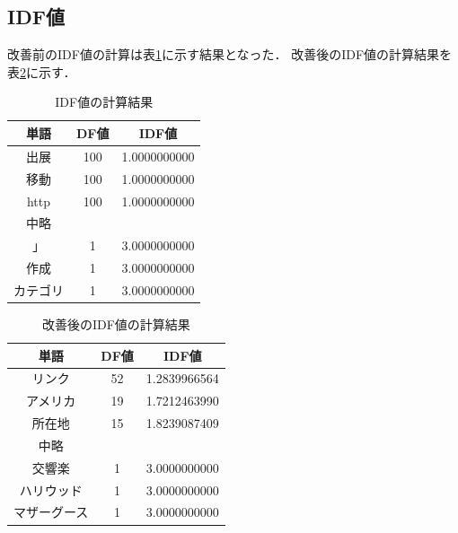 \documentclass[a4paper,11pt]{ltjsarticle}
\begin{document}
\subsection{IDF値}
改善前のIDF値の計算は表\ref{tab:IDF-result}に示す結果となった．
改善後のIDF値の計算結果を表\ref{tab:IDF-result2}に示す．
\begin{table}[htbp]
    \centering
    \caption{IDF値の計算結果}
    \label{tab:IDF-result}
    \begin{tabular}{|c|c|c|}
        \hline
        単語   & DF値 & IDF値         \\
        \hline
        出展   & 100 & 1.0000000000 \\
        \hline
        移動   & 100 & 1.0000000000 \\
        \hline
        http & 100 & 1.0000000000 \\
        \hline
        中略   &     &              \\
        \hline
        」    & 1   & 3.0000000000 \\
        \hline
        作成   & 1   & 3.0000000000 \\
        \hline
        カテゴリ & 1   & 3.0000000000 \\
        \hline
    \end{tabular}
\end{table}
\begin{table}[htbp]
    \centering
    \caption{改善後のIDF値の計算結果}
    \label{tab:IDF-result2}
    \begin{tabular}{|c|c|c|}
        \hline
        単語     & DF値 & IDF値         \\
        \hline
        リンク    & 52  & 1.2839966564 \\
        \hline
        アメリカ   & 19  & 1.7212463990 \\
        \hline
        所在地    & 15  & 1.8239087409 \\
        \hline
        中略     &     &              \\
        \hline

        交響楽    & 1   & 3.0000000000 \\
        \hline
        ハリウッド  & 1   & 3.0000000000 \\
        \hline
        マザーグース & 1   & 3.0000000000 \\
        \hline
    \end{tabular}
\end{table}
\newpage
\end{document}

